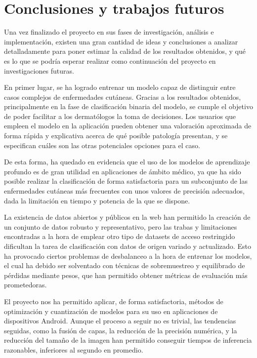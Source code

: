 \chapter{Conclusiones y trabajos futuros}

Una vez finalizado el proyecto en sus fases de investigación, análisis e implementación, existen una gran cantidad de ideas y conclusiones a analizar detalladamente para poner estimar la calidad de los resultados obtenidos, y qué es lo que se podría esperar realizar como continuación del proyecto en investigaciones futuras.

En primer lugar, se ha logrado entrenar un modelo capaz de distinguir entre casos complejos de enfermedades cutáneas. Gracias a los resultados obtenidos, principalmente en la fase de clasificación binaria del modelo, se cumple el objetivo de poder facilitar a los dermatólogos la toma de decisiones.  Los usuarios que empleen el modelo en la aplicación pueden obtener una valoración aproximada de forma rápida y explicativa acerca de qué posible patología presentan, y se especifican cuáles son las otras potenciales opciones para el caso.

De esta forma, ha quedado en evidencia que el uso de los modelos de aprendizaje profundo es de gran utilidad en aplicaciones de ámbito médico, ya que ha sido posible realizar la clasificación de forma satisfactoria para un subconjunto de las enfermedades cutáneas más frecuentes con unos valores de precisión adecuados, dada la limitación en tiempo y potencia de la que se dispone. 

La existencia de datos abiertos  y públicos en la web han permitido la creación de un conjunto de datos robusto y representativo, pero las trabas y limitaciones encontradas a la hora de emplear otro tipo de datasets de acceso restringido dificultan la tarea de clasificación con datos de origen variado y actualizado. Esto ha provocado ciertos problemas de desbalanceo a la hora de entrenar los modelos, el cual ha debido ser solventado con técnicas de sobremuestreo y equilibrado de pérdidas mediante pesos, que han permitido obtener métricas de evaluación más prometedoras.

El proyecto nos ha permitido aplicar, de forma satisfactoria, métodos de optimización y cuantización de modelos para su uso en aplicaciones de dispositivos Android. Aunque el proceso a seguir no es trivial, las tendencias seguidas, como la fusión de capas, la reducción de la precisión numérica, y la reducción del tamaño de la imagen han permitido conseguir tiempos de inferencia razonables, inferiores al segundo en promedio.

